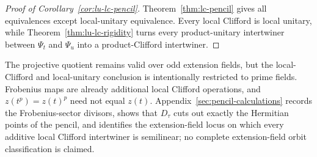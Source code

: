 \begin{proof}[Proof of Corollary~\ref{cor:lu-lc-pencil}]
Theorem~\ref{thm:lc-pencil} gives all equivalences except local-unitary
equivalence.  Every local Clifford is local unitary, while
Theorem~\ref{thm:lu-lc-rigidity} turns every product-unitary intertwiner
between \(\Psi_t\) and \(\Psi_u\) into a product-Clifford intertwiner.
\end{proof}

The projective quotient remains valid over odd extension fields, but the
local-Clifford and local-unitary conclusion is intentionally restricted to
prime fields.  Frobenius maps are already additional local Clifford
operations, and \(z(t^p)=z(t)^p\) need not equal \(z(t)\).
Appendix~\ref{sec:pencil-calculations} records the Frobenius-sector divisors,
shows that \(D_\tau\) cuts out exactly the Hermitian points of the pencil, and
identifies the extension-field locus on which every additive local Clifford
intertwiner is semilinear; no complete extension-field orbit classification
is claimed.
